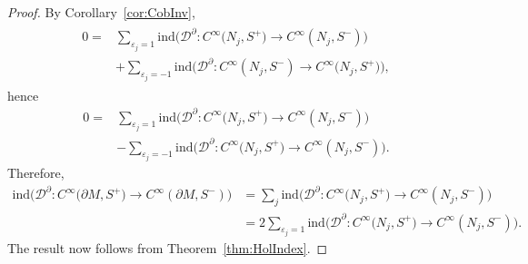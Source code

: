 \documentclass[11pt]{article}
\numberwithin{equation}{section}
\numberwithin{equation}{section}
\begin{document}
\begin{proof}
By Corollary~\ref{cor:CobInv},
\begin{align*}
\begin{aligned}
0
={}&
\sum_{\varepsilon_j=1} \mathrm{ind}\big(\mathcal{D}^\partial\colon C^\infty\big(N_j,S^+\big)\to C^\infty(N_j,S^-)\big) \\
& + \sum_{\varepsilon_j=-1} \mathrm{ind}\big(\mathcal{D}^\partial\colon C^\infty(N_j,S^-)\to C^\infty\big(N_j,S^+\big)\big),
\end{aligned}
\end{align*}
hence
\begin{align*}
0
={}&
\sum_{\varepsilon_j=1} \mathrm{ind}\big(\mathcal{D}^\partial\colon C^\infty\big(N_j,S^+\big)\to C^\infty(N_j,S^-)\big) \\
& - \sum_{\varepsilon_j=-1} \mathrm{ind}\big(\mathcal{D}^\partial\colon C^\infty\big(N_j,S^+\big)\to C^\infty(N_j,S^-)\big) .
\end{align*}
Therefore,
\begin{align*}
\mathrm{ind}\big(\mathcal{D}^\partial\colon C^\infty\big(\partial M,S^+\big)\to C^\infty(\partial M,S^-)\big)
&=
\sum_j \mathrm{ind}\big(\mathcal{D}^\partial\colon C^\infty\big(N_j,S^+\big)\to C^\infty(N_j,S^-)\big) \\
&=
2 \sum_{\varepsilon_j=1} \mathrm{ind}\big(\mathcal{D}^\partial\colon C^\infty\big(N_j,S^+\big)\to C^\infty(N_j,S^-)\big).
\end{align*}
The result now follows from Theorem~\ref{thm:HolIndex}.
\end{proof}
\end{document}
